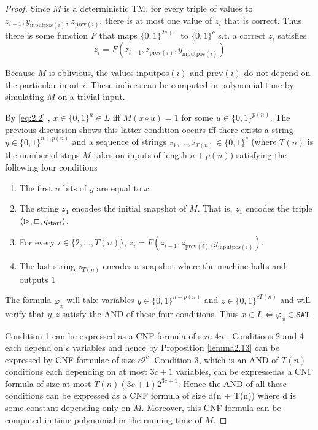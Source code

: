 \documentclass[11pt]{article}
\def \start {\text{start}}
\def \SAT {\texttt{SAT}}
\begin{document}
\begin{proof}
Since \(M\) is a deterministic TM, for every triple of values
to \(z_{i-1},y_{\text{inputpos}(i)}\), \(z_{\text{prev}(i)}\), there is at most one value
of \(z_i\) that is correct. Thus there is some function \(F\) that maps \(\{0,1\}^{2c+1}\)
to \(\{0,1\}^c\) s.t. a correct \(z_i\) satisfies
     \begin{equation*}
z_i=F(z_{i-1},z_{\text{prev}(i)},y_{\text{inputpos}(i)})
     \end{equation*}

Because \(M\) is oblivious, the values \(\text{inputpos}(i)\) and \(\text{prev}(i)\) do not
depend on the particular input \(i\). These indices can be computed in polynomial-time by
simulating \(M\) on a trivial input.

By \eqref{eq:2.2} , \(x\in\{0,1\}^{n}\in L\) iff \(M(x\circ u)=1\) for
some \(u\in\{0,1\}^{p(n)}\). The previous discussion shows this latter condition occurs iff
there exists a string \(y\in\{0,1\}^{n+p(n)}\) and a sequence of strings
\(z_1,\dots,z_{T(n)}\in\{0,1\}^c\) (where \(T(n)\) is the number of steps \(M\) takes on inputs
of length \(n+p(n)\)) satisfying the following four conditions
\begin{enumerate}
\item The first \(n\) bits of \(y\) are equal to \(x\)
\item The string \(z_1\) encodes the initial snapshot of \(M\). That is, \(z_1\) encodes the
triple \(\la\rhd,\Box,q_{\start}\ra\).
\item For every \(i\in\{2,\dots,T(n)\}\), \(z_i=F(z_{i-1},z_{\text{prev}(i)},y_{\text{inputpos}(i)})\).
\item The last string \(z_{T(n)}\) encodes a snapshot where the machine halts and outputs 1
\end{enumerate}


The formula \(\varphi_x\) will take variables \(y\in\{0,1\}^{n+p(n)}\)
and \(z\in\{0,1\}^{cT(n)}\) and will verify that \(y,z\) satisfy the AND of these four
conditions. Thus \(x\in L\Leftrightarrow\varphi_x\in\SAT\).

Condition 1 can be expressed as a CNF formula of size \(4n\) . Conditions 2 and 4 each depend
on \(c\) variables and hence by Proposition \ref{lemma2.13} can be expressed by CNF formulae of
size \(c2^c\). Condition 3, which is an AND of \(T(n)\) conditions each  depending on at most \(3c+1\)
variables, can be expressedas a CNF formula of size at most \(T(n)(3c+1)2^{3c+1}\). Hence the AND of all
these conditions can be expressed as a CNF formula of size d(n + T(n)) where d is some constant
depending only on \(M\). Moreover, this CNF formula can be computed in time polynomial in the running
time of \(M\).
\end{proof}
\end{document}
